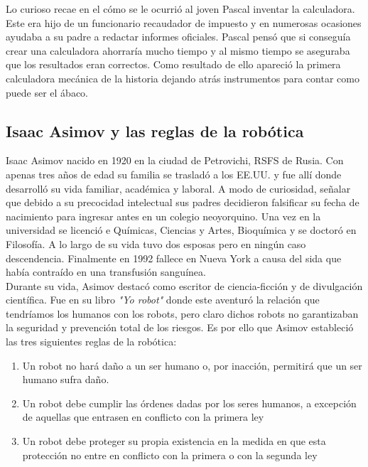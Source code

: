 Lo curioso recae en el cómo se le ocurrió al joven Pascal inventar la calculadora. Este era hijo de un funcionario recaudador de impuesto y en numerosas ocasiones ayudaba a su padre a redactar informes oficiales. Pascal pensó que si conseguía crear una calculadora ahorraría mucho tiempo y al mismo tiempo se aseguraba que los resultados eran correctos. Como resultado de ello apareció la primera calculadora mecánica de la historia dejando atrás instrumentos para contar como puede ser el ábaco.





\subsection{Isaac Asimov y las reglas de la robótica}

Isaac Asimov nacido en 1920 en la ciudad de Petrovichi, RSFS de Rusia. Con apenas tres años de edad su familia se trasladó a los EE.UU. y fue allí donde desarrolló su vida familiar, académica y laboral. A modo de curiosidad, señalar que debido a su precocidad intelectual sus padres decidieron falsificar su fecha de nacimiento para ingresar antes en un colegio neoyorquino. Una vez en la universidad se licenció e Químicas, Ciencias y Artes, Bioquímica y se doctoró en Filosofía. A lo largo de su vida tuvo dos esposas pero en ningún caso descendencia. Finalmente en 1992 fallece en Nueva York a causa del sida que había contraído en una transfusión sanguínea.\\

Durante su vida, Asimov destacó como escritor de ciencia-ficción y de divulgación científica. Fue en su libro \textit{"Yo robot"} donde este aventuró la relación que tendríamos los humanos con los robots, pero claro dichos robots no garantizaban la seguridad y prevención total de los riesgos. Es por ello que Asimov estableció las tres siguientes reglas de la robótica:

\begin{enumerate}
\item Un robot no hará daño a un ser humano o, por inacción, permitirá que un ser humano sufra daño.
\item Un robot debe cumplir las órdenes dadas por los seres humanos, a excepción de aquellas que entrasen en conflicto con la primera ley
\item Un robot debe proteger su propia existencia en la medida en que esta protección no entre en conflicto con la primera o con la segunda ley
\end{enumerate}

